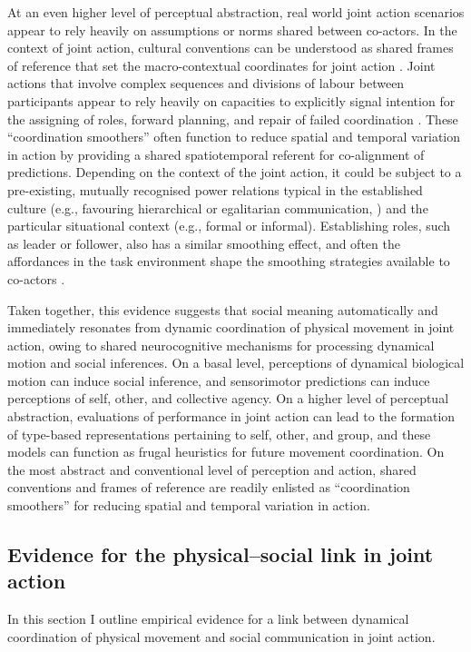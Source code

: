 \begin{CJK}{UTF8}{gbsn}
At an even higher level of perceptual abstraction, real world joint action scenarios appear to rely heavily on assumptions or norms shared between co-actors.  In the context of joint action, cultural conventions can be understood as shared frames of reference that set the macro-contextual coordinates for joint action \citep{Clark2013}. Joint actions that involve complex sequences and divisions of labour between participants appear to rely heavily on capacities to explicitly signal intention for the assigning of roles, forward planning, and repair of failed coordination \citep{Frith2010}.  These ``coordination smoothers'' \citep{Vesper2017} often function to reduce spatial and temporal variation in action by providing a shared spatiotemporal referent for co-alignment of predictions.  Depending on the context of the joint action, it could be subject to a pre-existing, mutually recognised power relations typical in the established culture (e.g., favouring hierarchical or egalitarian communication, \citep[see]{Cheon2011}) and the particular situational context (e.g., formal or informal).  Establishing roles, such as leader or follower, also has a similar smoothing effect, and often the affordances in the task environment shape the smoothing strategies available to co-actors \citep{Marsh2009}.

Taken together, this evidence suggests that social meaning automatically and immediately resonates from dynamic coordination of physical movement in joint action, owing to shared neurocognitive mechanisms for processing dynamical motion and social inferences.  On a basal level, perceptions of dynamical biological motion can induce social inference, and sensorimotor predictions can induce perceptions of self, other, and collective agency.  On a higher level of perceptual abstraction, evaluations of performance in joint action can lead to the formation of type-based representations pertaining to self, other, and group, and these models can function as frugal heuristics for future movement coordination.  On the most abstract and conventional level of perception and action, shared conventions and frames of reference are readily enlisted as ``coordination smoothers'' for reducing spatial and temporal variation in action.


\subsection{Evidence for the physical--social link in joint action}
In this section I outline empirical evidence for a link between dynamical coordination of physical movement and social communication in joint action.




\end{CJK}
